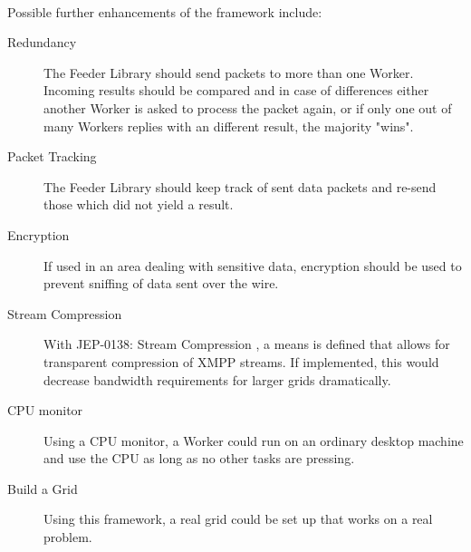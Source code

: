 \paragraph{}
Possible further enhancements of the framework include:
\begin{description}
\item[Redundancy] The Feeder Library should send packets to more than one Worker. Incoming results should be compared and in case of differences either another Worker is asked to process the packet again, or if only one out of many Workers replies with an different result, the majority "wins".
\item[Packet Tracking] The Feeder Library should keep track of sent data packets and re-send those which did not yield a result.
\item[Encryption] If used in an area dealing with sensitive data, encryption should be used to prevent sniffing of data sent over the wire.
\item[Stream Compression] With JEP-0138: Stream Compression \cite{jep0138}, a means is defined that allows for transparent compression of XMPP streams. If implemented, this would decrease bandwidth requirements for larger grids dramatically.
\item[CPU monitor] Using a CPU monitor, a Worker could run on an ordinary desktop machine and use the CPU as long as no other tasks are pressing.
\item[Build a Grid] Using this framework, a real grid could be set up that works on a real problem.
\end{description}
